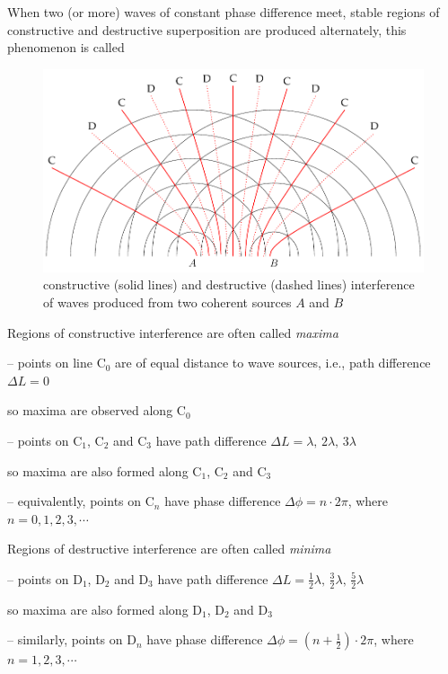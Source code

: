When two (or more) waves of constant phase difference meet, stable regions of constructive and destructive superposition are produced alternately, this phenomenon is called 



\begin{figure}[htp]
	\centering
	\includegraphics[width=1\textwidth]{interference.pdf}
\caption{constructive (solid lines) and destructive (dashed lines) interference of waves produced from two coherent sources $A$ and $B$}
\end{figure}
\vspace{1cm}
Regions of constructive interference are often called \emph{maxima}

\begin{compactitem}
	\item[--] points on line C$_0$ are of equal distance to wave sources, i.e., path difference $\Delta L = 0$
	
	so maxima are observed along C$_0$
	
	\item[--] points on C$_1$, C$_2$ and C$_3$ have path difference $\Delta L = \lambda, \, 2\lambda, \, 3\lambda$
	
	so maxima are also formed along C$_1$, C$_2$ and C$_3$
	
	\item[--] equivalently, points on C$_n$ have phase difference $\Delta \phi = n\cdot 2\pi$, where $n=0,1,2,3,\cdots$
\end{compactitem} 

Regions of destructive interference are often called \emph{minima}

\begin{compactitem}
	\item[--] points on D$_1$, D$_2$ and D$_3$ have path difference $\Delta L = \frac{1}{2}\lambda, \, \frac{3}{2}\lambda, \, \frac{5}{2}\lambda$
	
	so maxima are also formed along D$_1$, D$_2$ and D$_3$
	
	\item[--] similarly, points on D$_n$ have phase difference $\Delta \phi = \left( n+\frac{1}{2} \right) \cdot 2\pi$, where $n=1,2,3,\cdots$
\end{compactitem} 






